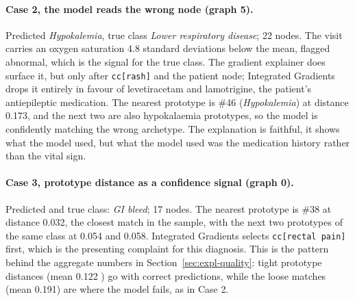 \paragraph{Case 2, the model reads the wrong node (graph 5).}
Predicted \emph{Hypokalemia}, true class \emph{Lower respiratory disease}; 22
nodes. The visit carries an oxygen saturation 4.8 standard deviations below the
mean, flagged abnormal, which is the signal for the true class. The gradient
explainer does surface it, but only after \texttt{cc[rash]} and the patient node;
Integrated Gradients drops it entirely in favour of levetiracetam and
lamotrigine, the patient's antiepileptic medication. The nearest prototype is
\#46 (\emph{Hypokalemia}) at distance 0.173, and the next two are also
hypokalaemia prototypes, so the model is confidently matching the wrong
archetype. The explanation is faithful, it shows what the model used, but what
the model used was the medication history rather than the vital sign.

\paragraph{Case 3, prototype distance as a confidence signal (graph 0).}
Predicted and true class: \emph{GI bleed}; 17 nodes. The nearest prototype is
\#38 at distance 0.032, the closest match in the sample, with the next two
prototypes of the same class at 0.054 and 0.058. Integrated Gradients selects
\texttt{cc[rectal pain]} first, which is the presenting complaint for this
diagnosis. This is the pattern behind the aggregate numbers in
Section~\ref{sec:expl-quality}: tight prototype distances (mean 0.122 ) go with correct predictions, while the loose matches (mean
0.191) are where the model fails, as in Case 2.

